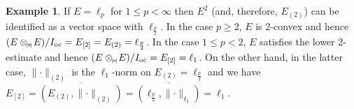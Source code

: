 \documentclass[12pt]{amsart}
\theoremstyle{plain}
\theoremstyle{definition}
\newtheorem{example}[theorem]{Example}
\newcommand{\abs}[1]{\lvert#1\rvert}
\newcommand{\norm}[1]{\lVert#1\rVert}
\renewcommand{\le}{\leqslant}
\renewcommand{\ge}{\geqslant}
\def\api{{\abs{\!\pi\!}}}
\def\ftp{\otimes_{\!\scriptscriptstyle\api}\!}
\def\Ioc{I_{\rm oc}}
\begin{document}
\begin{example}
\label{examp:ellp}
  If $E=\ell_p$ for $1\le p<\infty$ then $E^2$ (and, therefore,
  $E_{(2)}$) can be identified as a vector space with
  $\ell_{\frac{p}{2}}$. In the case $p\ge 2$, $E$ is 2-convex and
  hence $(E\ftp E)/\Ioc = E_{[2]} = E_{(2)} = \ell_{\frac{p}{2}}$. In
  the case $1\le p<2$, $E$ satisfies the lower 2-estimate and hence
  $(E\ftp E)/\Ioc=E_{[2]} = \ell_1$. On the other hand, in the
  latter case, $\norm{\cdot}_{(2)}$ is the $\ell_1$-norm on
  $E_{(2)}=\ell_{\frac{p}{2}}$ and we have
  \begin{math}
    E_{[2]}
    =\overline{(E_{(2)},\norm{\cdot}_{(2)})}
    =\overline{(\ell_{\frac{p}{2}},\norm{\cdot}_{\ell_1})} 
    =\ell_1.
  \end{math}
\end{example}


%
%

\providecommand{\bysame}{\leavevmode\hbox to3em{\hrulefill}\thinspace}
\end{document}
